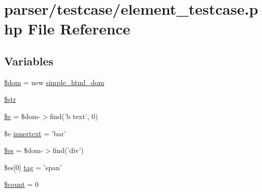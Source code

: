 \hypertarget{element__testcase_8php}{\section{parser/testcase/element\+\_\+testcase.php File Reference}
\label{element__testcase_8php}
}
\subsection*{Variables}
\begin{DoxyCompactItemize}
\item 
\hyperlink{element__testcase_8php_a46127a794280dd592812c25b62af34b0}{\$dom} = new \hyperlink{classsimple__html__dom}{simple\+\_\+html\+\_\+dom}
\item 
\hyperlink{element__testcase_8php_a7542d95618011800c61773127fa625cf}{\$str}
\item 
\hyperlink{element__testcase_8php_ab74076a9b7e1d23d12b9e8d65e60315a}{\$e} = \$dom-\/$>$find('b text', 0)
\item 
\$e \hyperlink{element__testcase_8php_afc42b425f411d415f2b82ae64a8bd185}{innertext} = 'bar'
\item 
\hyperlink{element__testcase_8php_a3b7fe8df18180e15ae677b41b1507990}{\$es} = \$dom-\/$>$find('div')
\item 
\$es\mbox{[}0\mbox{]} \hyperlink{element__testcase_8php_a18413934cd1931907ddc5ac04031be0a}{tag} = 'span'
\item 
\hyperlink{element__testcase_8php_af789423037bbc89dc7c850e761177570}{\$count} = 0
\end{DoxyCompactItemize}


